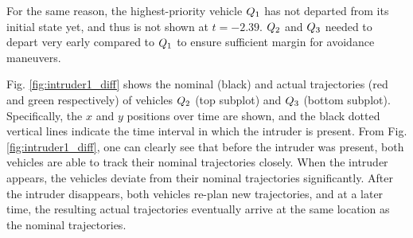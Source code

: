 For the same reason, the highest-priority vehicle $Q_1$ has not departed from its initial state yet, and thus is not shown at $t=-2.39$. $Q_2$ and $Q_3$ needed to depart very early compared to $Q_1$ to ensure sufficient margin for avoidance maneuvers.

Fig. \ref{fig:intruder1_diff} shows the nominal (black) and actual trajectories (red and green respectively) of vehicles $Q_2$ (top subplot) and $Q_3$ (bottom subplot). Specifically, the $x$ and $y$ positions over time are shown, and the black dotted vertical lines indicate the time interval in which the intruder is present. From Fig. \ref{fig:intruder1_diff}, one can clearly see that before the intruder was present, both vehicles are able to track their nominal trajectories closely. When the intruder appears, the vehicles deviate from their nominal trajectories significantly. After the intruder disappears, both vehicles re-plan new trajectories, and at a later time, the resulting actual trajectories eventually arrive at the same location as the nominal trajectories.


